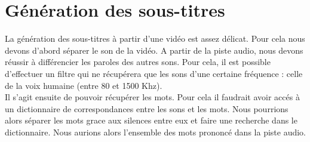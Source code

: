 \documentclass[10pt,a4paper]{article}
\begin{document}
\section*{Génération des sous-titres}

La génération des sous-titres à partir d'une vidéo est assez délicat. Pour cela nous devons d'abord séparer le son de la vidéo.
A partir de la piste audio, nous devons réussir à différencier les paroles des autres sons. Pour cela, il est possible d'effectuer un filtre qui ne récupérera que les sons d'une certaine fréquence : celle de la voix humaine (entre 80 et 1500 Khz).\\
Il s'agit ensuite de pouvoir récupérer les mots. Pour cela il faudrait avoir accés à un dictionnaire de correspondances entre les sons et les mots. Nous pourrions alors séparer les mots grace aux silences entre eux et faire une recherche dans le dictionnaire. Nous aurions alors l'ensemble des mots prononcé dans la piste audio.
\end{document}
